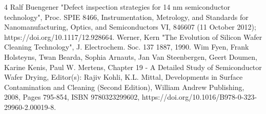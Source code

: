\documentclass[12pt]{report}
\begin{document}
\begin{thebibliography}{4}
	 Ralf Buengener "Defect inspection strategies for 14 nm semiconductor technology", Proc. SPIE 8466, Instrumentation, Metrology, and Standards for Nanomanufacturing, Optics, and Semiconductors VI, 846607 (11 October 2012); https://doi.org/10.1117/12.928664.
	 Werner, Kern "The Evolution of Silicon Wafer Cleaning Technology", J. Electrochem. Soc. 137 1887, 1990. 
	Wim Fyen, Frank Holsteyns, Twan Bearda, Sophia Arnauts, Jan Van Steenbergen, Geert Doumen, Karine Kenis, Paul W. Mertens,
Chapter 19 - A Detailed Study of Semiconductor Wafer Drying,
Editor(s): Rajiv Kohli, K.L. Mittal,
Developments in Surface Contamination and Cleaning (Second Edition),
William Andrew Publishing,
2008,
Pages 795-854,
ISBN 9780323299602,
https://doi.org/10.1016/B978-0-323-29960-2.00019-8.
\end{thebibliography}
\end{document}
